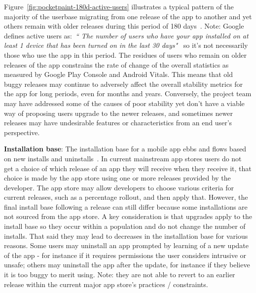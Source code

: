 Figure~\ref{fig:pocketpaint-180d-active-users} illustrates a typical pattern of the majority of the userbase migrating from one release of the  app to another and yet others remain with older releases during this period of 180 days~. Note: Google defines active users as:~\emph{``
The number of users who have your app installed on at least 1 device that has been turned on in the last 30 days"}~ so it's not necessarily those who use the app in this period. The residues of users who remain on older releases of the app constrains the rate of change of the overall statistics as measured by Google Play Console and Android Vitals. This means that old buggy releases may continue to adversely affect the overall stability metrics for the app for long periods, even for months and years. Conversely, the project team may have addressed some of the causes of poor stability yet don't have a viable way of proposing users upgrade to the newer releases, and sometimes newer releases may have undesirable features or characteristics from an end user's perspective.

\textbf{Installation base}: The installation base for a mobile app ebbs and flows based on new installs and uninstalls~. In current mainstream app stores users do not get a choice of which release of an app they will receive when they receive it, that choice is made by the app store using one or more releases provided by the developer. The app store may allow developers to choose various criteria for current releases, such as a percentage rollout, and then apply that. However, the final install base following a release can still differ because some installations are not sourced from the app store. A key consideration is that upgrades apply to the install base so they occur within a population and do not change the number of installs. That said they may lead to decreases in the installation base for various reasons. Some users may uninstall an app prompted by learning of a new update of the app - for instance if it requires permissions the user considers intrusive or unsafe; others may uninstall the app after the update, for instance if they believe it is too buggy to merit using. Note: they are not able to revert to an earlier release within the current major app store's practices / constraints. 

